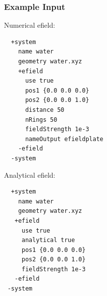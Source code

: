 \documentclass[bibliography=totocnumbered,a4paper,10pt,oneside]{scrbook}
\begin{document}
\subsubsection{Example Input}
Numerical efield:
\begin{lstlisting}
  +system
    name water 
    geometry water.xyz
    +efield
      use true
      pos1 {0.0 0.0 0.0}
      pos2 {0.0 0.0 1.0}
      distance 50
      nRings 50
      fieldStrength 1e-3
      nameOutput efieldplate
    -efield
  -system
 \end{lstlisting}
Analytical efield:
\begin{lstlisting}
  +system
    name water 
    geometry water.xyz
   +efield
     use true
     analytical true
     pos1 {0.0 0.0 0.0}
     pos2 {0.0 0.0 1.0}
     fieldStrength 1e-3
   -efield
 -system
\end{lstlisting}
\end{document}
